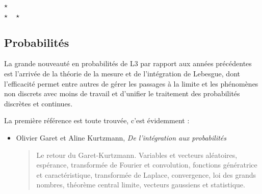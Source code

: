 \documentclass{article}
\def\separateur{\begin{center}
$\star$\\
$\star\quad\star$
\end{center}}
\begin{document}
\separateur
\subsection{Probabilités}

La grande nouveauté en probabilités de L3 par rapport aux années précédentes est l'arrivée de la théorie de la mesure et de l'intégration de Lebesgue, dont l'efficacité permet entre autres de gérer les passages à la limite et les phénomènes non discrets avec moins de travail et d'unifier le traitement des probabilités discrètes et continues.


La première référence est toute trouvée, c'est évidemment : 

\begin{mdframed}
\begin{itemize}
\item Olivier Garet et Aline Kurtzmann, \emph{De l'intégration aux probabilités}
\begin{quote}
Le retour du Garet-Kurtzmann. Variables et vecteurs aléatoires, espérance, transformée de Fourier et convolution, fonctions génératrice et caractéristique, transformée de Laplace, convergence, loi des grands nombres, théorème central limite, vecteurs gaussiens et statistique.
\end{quote}
\end{itemize}
\end{mdframed}
\end{document}

